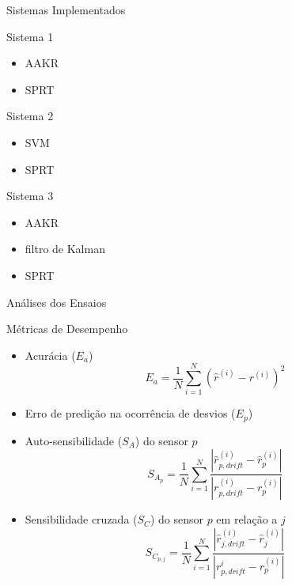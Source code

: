 \documentclass{beamer}
\begin{document}
\begin{frame}{Sistemas Implementados}

    \begin{block}{Sistema 1}
        \begin{itemize}
            \item AAKR
            \item SPRT
        \end{itemize}
    \end{block}

    \begin{block}{Sistema 2}
        \begin{itemize}
            \item SVM
            \item SPRT
        \end{itemize}
    \end{block}

    \begin{block}{Sistema 3}
        \begin{itemize}
            \item AAKR
            \item filtro de Kalman
            \item SPRT
        \end{itemize}
    \end{block}

    \note{
    \begin{itemize}
        \item 
    \end{itemize}}
    
\end{frame}

\begin{frame}{Análises dos Ensaios}
    
\end{frame}

\begin{frame}{Métricas de Desempenho}
    \begin{itemize}
        \item Acurácia ($E_a$)
            $$ E_a = \frac{1}{N} \sum \limits_{i=1}^N \left( \hat{r}^{(i)} - r^{(i)}
            \right)^2$$
        \item Erro de predição na ocorrência de desvios ($E_p$)
        \item Auto-sensibilidade ($S_A$) do sensor $p$
            $$
            S_{A_p} = \frac{1}{N} \sum \limits_{i=1}^N \frac{\left| \hat{r}_{p, drift}^{(i)} -
            \hat{r}^{(i)}_{p} \right|}{\left| r_{p,drift}^{(i)} - r^{(i)}_{p} \right|}
            $$
        \item Sensibilidade cruzada ($S_C$) do sensor $p$ em relação a $j$
            $$
            S_{C_{p,j}} = \frac{1}{N} \sum \limits_{i=1}^N \frac{\left| \hat{r}_{j,drift}^{(i)} -
            \hat{r}^{(i)}_{j} \right|}{\left| r_{p,drift}^{i} - r_{p}^{(i)} \right|}
            $$
    \end{itemize}
    
\end{frame}
\end{document}
